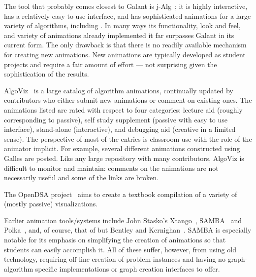 The tool that probably comes closest to Galant is j-Alg~\cite{j-Alg};
it is highly interactive, has a relatively easy to use interface, and has sophisticated animations for a large variety of algorithms,
including .
In many ways its functionality, look and feel, and variety of animations
already implemented it far surpasses Galant in its current form.
The only drawback is that there is no readily available mechanism
for creating new animations.
New animations are typically developed as
student projects and require a fair amount of effort --- not surprising given
the sophistication of the results.



AlgoViz~\cite{AlgoViz}
is a large catalog of algorithm animations, continually updated by
contributors who either submit new animations or comment on existing ones.
The animations listed are rated with respect to four categories:
lecture aid (roughly corresponding to passive), self study supplement (passive with
easy to use interface),
stand-alone (interactive),
and debugging aid (creative in a limited sense).
The perspective of most of the entries is classroom use with the role of the
animator implicit.
For example, several different animations constructed using Galles are posted.
Like any large repository with many contributors, AlgoViz is difficult to
monitor and
maintain: comments on the animations are not necessarily useful and some of the links are broken.


The OpenDSA project~\cite{%
2011-ProgramVisualization-Shaffer,2011-Koli-Shaffer,2012-SIGCSE-Fouh%
}
aims to create a textbook compilation of a variety of
(mostly passive) visualizations.

Earlier animation tools/systems include John Stasko's Xtango~\cite{Xtango},
SAMBA~\cite{SAMBA} and Polka~\cite{Polka,1992-TR_GIT-Stasko}, and, of course,
that of but
Bentley and Kernighan~\cite{1987-Animation-Bentley}.
SAMBA is especially notable for its emphasis on simplifying the creation of
animations so that students can easily accomplish it.
All of these suffer, however, from using old technology, requiring off-line creation
of problem instances and having no graph-algorithm specific implementations
or graph creation interfaces to offer.

